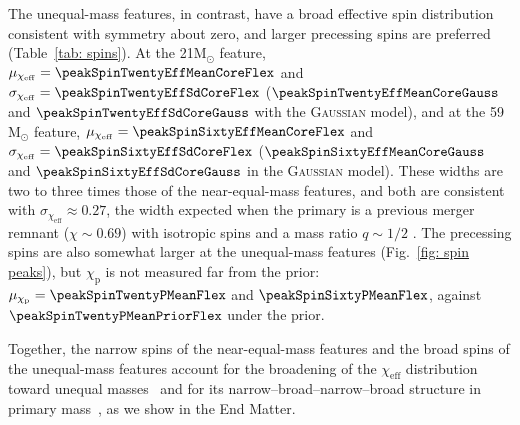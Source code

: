 \documentclass[%
    aps,
    prl,
    reprint,
    superscriptaddress,
    nolongbibliography,
    nobibnotes,
    nofootinbib,
    linenumbers,
    amsmath,amssymb,
]{revtex4-2}
\newcommand{\Msun}{\ensuremath{\mathrm{M}_{\odot}}}
\newcommand{\chieff}{\ensuremath{\chi_{\mathrm{eff}}}}
\newcommand{\chip}{\ensuremath{\chi_{\mathrm{p}}}}
\newcommand{\twoGoneG}{\ac{2G1G}\xspace}
\newcommand{\jh}[1]{{\color{orange}JH: #1}}
\newcommand{\gaussianspins}{\textsc{Gaussian}\xspace}
\newcommand{\featTen}{10\xspace}
\newcommand{\featTwenty}{21\xspace}
\newcommand{\featSixty}{59\xspace}
\begin{document}
The unequal-mass features, in contrast, have a broad effective spin distribution consistent with symmetry about zero, and larger precessing spins are preferred (Table~\ref{tab: spins}). At the \featTwenty $\Msun$ feature, $\mu_{\chieff} = \peakSpinTwentyEffMeanCoreFlex$ and $\sigma_{\chieff} = \peakSpinTwentyEffSdCoreFlex$ ($\peakSpinTwentyEffMeanCoreGauss$ and $\peakSpinTwentyEffSdCoreGauss$ with the \gaussianspins model), and at the \featSixty $\Msun$ feature, $\mu_{\chieff} = \peakSpinSixtyEffMeanCoreFlex$ and $\sigma_{\chieff} = \peakSpinSixtyEffSdCoreFlex$ ($\peakSpinSixtyEffMeanCoreGauss$ and $\peakSpinSixtyEffSdCoreGauss$ in the \gaussianspins model). These widths are two to three times those of the near-equal-mass features, and both are consistent with $\sigma_{\chieff} \approx 0.27$, the width expected when the primary is a previous merger remnant ($\chi\sim0.69$) with isotropic spins and a mass ratio $q\sim 1/2$ \cite{Gerosa:2021mno}. The precessing spins are also somewhat larger at the unequal-mass features (Fig.~\ref{fig: spin peaks}), but $\chip$ is not measured far from the prior: $\mu_{\chip} = \peakSpinTwentyPMeanFlex$ and $\peakSpinSixtyPMeanFlex$, against $\peakSpinTwentyPMeanPriorFlex$ under the prior. %

Together, the narrow spins of the near-equal-mass features and the broad spins of the unequal-mass features account for the broadening of the $\chieff$ distribution toward unequal masses~\cite{Callister:2021fpo, Adamcewicz:2023mov, LIGOScientific:2026ctl} and for its narrow--broad--narrow--broad structure in primary mass~\cite{Antonini:2025ilj, Tong:2025xir, Plunkett:2026pxt, Flanagan:2026ayy}, as we show in the End Matter.
\end{document}

